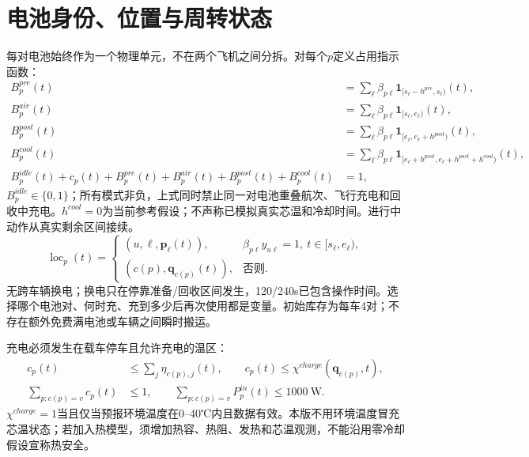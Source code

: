 \section{电池身份、位置与周转状态}
\noindent 每对电池始终作为一个物理单元，不在两个飞机之间分拆。对每个$p$定义占用指示函数：
\begin{align}
 B_p^{pre}(t)&=\sum_\ell\beta_{p\ell}\mathbf1_{[s_\ell-h^{pre},s_\ell)}(t),\\
 B_p^{air}(t)&=\sum_\ell\beta_{p\ell}\mathbf1_{[s_\ell,e_\ell)}(t),\\
 B_p^{post}(t)&=\sum_\ell\beta_{p\ell}\mathbf1_{[e_\ell,e_\ell+h^{post})}(t),\\
 B_p^{cool}(t)&=\sum_\ell\beta_{p\ell}\mathbf1_{[e_\ell+h^{post},e_\ell+h^{post}+h^{cool})}(t),\\
 B_p^{idle}(t)+c_p(t)+B_p^{pre}(t)+B_p^{air}(t)+B_p^{post}(t)+B_p^{cool}(t)&=1,
 \label{eng:eq:batteryavailability}
\end{align}
\noindent $B_p^{idle}\in\{0,1\}$；所有模式非负，上式同时禁止同一对电池重叠航次、飞行充电和回收中充电。$h^{cool}=0$为当前参考假设；不声称已模拟真实芯温和冷却时间。进行中动作从真实剩余区间接续。
\begin{equation}
 \operatorname{loc}_p(t)=
 \begin{cases}
 (u,\ell,\mathbf p_\ell(t)),&\beta_{p\ell}y_{u\ell}=1,\ t\in[s_\ell,e_\ell),\\
 (c(p),\mathbf q_{c(p)}(t)),&\text{否则}.
 \end{cases}
 \label{eng:eq:batterylocation}
\end{equation}
\noindent 无跨车辆换电；换电只在停靠准备/回收区间发生，120/240s已包含操作时间。选择哪个电池对、何时充、充到多少后再次使用都是变量。初始库存为每车4对；不存在额外免费满电池或车辆之间瞬时搬运。

\noindent 充电必须发生在载车停车且允许充电的温区：
\begin{align}
 c_p(t)&\le\sum_j\eta_{c(p),j}(t),\qquad c_p(t)\le\chi^{charge}(\mathbf q_{c(p)},t),\\
 \sum_{p:c(p)=v}c_p(t)&\le1,\qquad
 \sum_{p:c(p)=v}P_p^{in}(t)\le1000\ \mathrm W.
 \label{eng:eq:chargingcapacity}
\end{align}
\noindent $\chi^{charge}=1$当且仅当预报环境温度在0--40℃内且数据有效。本版不用环境温度冒充芯温状态；若加入热模型，须增加热容、热阻、发热和芯温观测，不能沿用零冷却假设宣称热安全。
\clearpage

